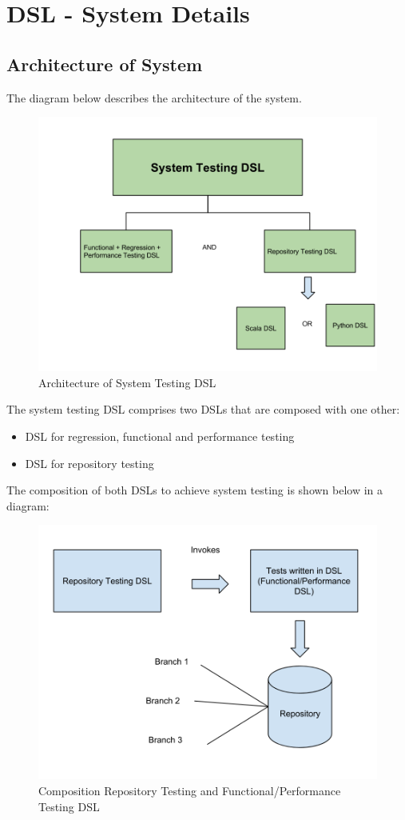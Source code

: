 \newpage
\section{DSL - System Details}

\subsection{Architecture of System}

The diagram below describes the architecture of the system.

\begin{figure}[H]
  \centering
    \includegraphics[width=450px]{figures/architecture.png}
  \caption{Architecture of System Testing DSL}
\end{figure}

\noindent
The system testing DSL comprises two DSLs that are composed with one other:
\begin{itemize}
\item DSL for regression, functional and performance testing
\item DSL for repository testing
\end{itemize}

\noindent
The composition of both DSLs to achieve system testing is shown below in a diagram:

\begin{figure}[H]
  \centering
    \includegraphics[width=450px]{figures/repo_test_diagram.png}
    \caption{Composition Repository Testing and Functional/Performance Testing DSL}
\end{figure}

